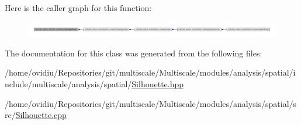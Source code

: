 \-Here is the caller graph for this function\-:
\nopagebreak
\begin{figure}[H]
\begin{center}
\leavevmode
\includegraphics[width=350pt]{classmultiscale_1_1analysis_1_1Silhouette_a21fab3292947caed2dbab0da542ac24c_icgraph}
\end{center}
\end{figure}




\-The documentation for this class was generated from the following files\-:\begin{DoxyCompactItemize}
\item 
/home/ovidiu/\-Repositories/git/multiscale/\-Multiscale/modules/analysis/spatial/include/multiscale/analysis/spatial/\hyperlink{Silhouette_8hpp}{\-Silhouette.\-hpp}\item 
/home/ovidiu/\-Repositories/git/multiscale/\-Multiscale/modules/analysis/spatial/src/\hyperlink{Silhouette_8cpp}{\-Silhouette.\-cpp}\end{DoxyCompactItemize}
